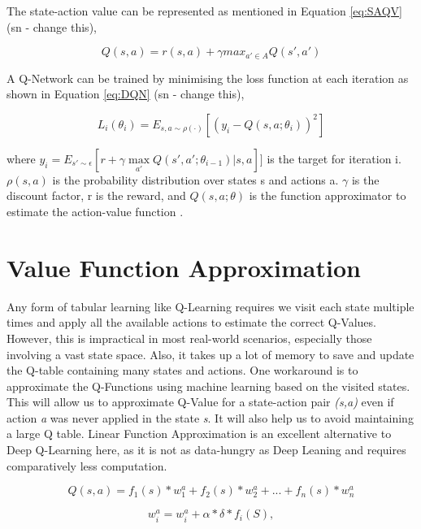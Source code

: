 \documentclass[logo,msc]{infthesis}           %
\begin{document}
 The state-action value can be represented as mentioned in Equation \ref{eq:SAQV} (sn - change this),

\begin{equation}
Q(s,a) = r(s,a) + {\gamma} max_{a'\in A} Q(s',a')
\label{eq:SAQV}
\end{equation}
 
 A Q-Network can be trained by minimising the loss function at each iteration as shown in Equation \ref{eq:DQN} (sn - change this),

\begin{equation} L_{i}(\theta _{i}) = E_{s,a\sim\rho(\cdot)}[(y_{i} - Q(s,a;\theta _{i}))^2]
\label{eq:DQN}
\end{equation}

where \(y_{i} = E_{s'\sim\epsilon}[r+\gamma\max\limits_{{a'}}Q(s', a'; \theta_{i-1})|s, a]]\) is the target for iteration i. \(\rho(s,a)\) is the probability distribution over states s and actions a. \(\gamma\) is the discount factor, r is the reward, and \(Q(s,a;\theta)\) is the function approximator to estimate the action-value function \cite{DBLP:journals/corr/MnihKSGAWR13}.

\section{Value Function Approximation}

Any form of tabular learning like Q-Learning requires we visit each state multiple times and apply all the available actions to estimate the correct Q-Values. However, this is impractical in most real-world scenarios, especially those involving a vast state space. Also, it takes up a lot of memory to save and update the Q-table containing many states and actions. One workaround is to approximate the Q-Functions using machine learning based on the visited states\cite{580874}. This will allow us to approximate Q-Value for a state-action pair \textit{(s,a)} even if action \textit{a} was never applied in the state \textit{s}. It will also help us to avoid maintaining a large Q table. Linear Function Approximation \cite{P2} is an excellent alternative to Deep Q-Learning here, as it is not as data-hungry as Deep Leaning and requires comparatively less computation.

\begin{equation}
Q(s,a) = f_1(s) * w_1^a + f_2(s) * w_2^a + ... + f_n(s) * w_n^a 
\label{eq:Q_Approx}
\end{equation}

\begin{equation}
w_i^a = w_i^a  + {\alpha} * {\delta} * f_i(S),
\label{eq:W_Approx}
\end{equation}
\end{document}
